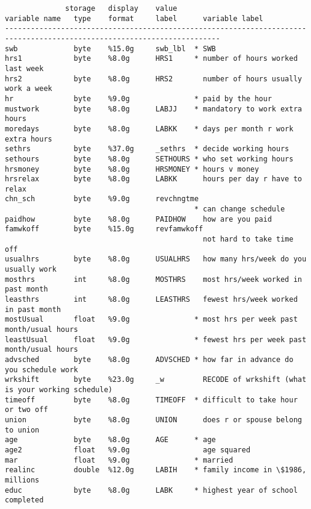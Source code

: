 \documentclass[10pt, letterpaper]{article}
\begin{document}
\begin{spacing}{1.4} %



{\footnotesize
\begin{spacing}{.9}
\begin{verbatim} 
              storage   display    value
variable name   type    format     label      variable label
------------------------------------------------------------------------------------------------------------------------
swb             byte    %15.0g     swb_lbl  * SWB
hrs1            byte    %8.0g      HRS1     * number of hours worked last week
hrs2            byte    %8.0g      HRS2       number of hours usually work a week
hr              byte    %9.0g               * paid by the hour
mustwork        byte    %8.0g      LABJJ    * mandatory to work extra hours
moredays        byte    %8.0g      LABKK    * days per month r work extra hours
sethrs          byte    %37.0g     _sethrs  * decide working hours
sethours        byte    %8.0g      SETHOURS * who set working hours
hrsmoney        byte    %8.0g      HRSMONEY * hours v money
hrsrelax        byte    %8.0g      LABKK      hours per day r have to relax
chn_sch         byte    %9.0g      revchngtme
                                            * can change schedule
paidhow         byte    %8.0g      PAIDHOW    how are you paid
famwkoff        byte    %15.0g     revfamwkoff
                                              not hard to take time off
usualhrs        byte    %8.0g      USUALHRS   how many hrs/week do you usually work
mosthrs         int     %8.0g      MOSTHRS    most hrs/week worked in past month
leasthrs        int     %8.0g      LEASTHRS   fewest hrs/week worked in past month
mostUsual       float   %9.0g               * most hrs per week past month/usual hours
leastUsual      float   %9.0g               * fewest hrs per week past month/usual hours
advsched        byte    %8.0g      ADVSCHED * how far in advance do you schedule work
wrkshift        byte    %23.0g     _w         RECODE of wrkshift (what is your working schedule)
timeoff         byte    %8.0g      TIMEOFF  * difficult to take hour or two off
union           byte    %8.0g      UNION      does r or spouse belong to union
age             byte    %8.0g      AGE      * age
age2            float   %9.0g                 age squared
mar             float   %9.0g               * married
realinc         double  %12.0g     LABIH    * family income in \$1986, millions
educ            byte    %8.0g      LABK     * highest year of school completed

\end{verbatim}
\end{spacing}}
\end{spacing}
\end{document}
